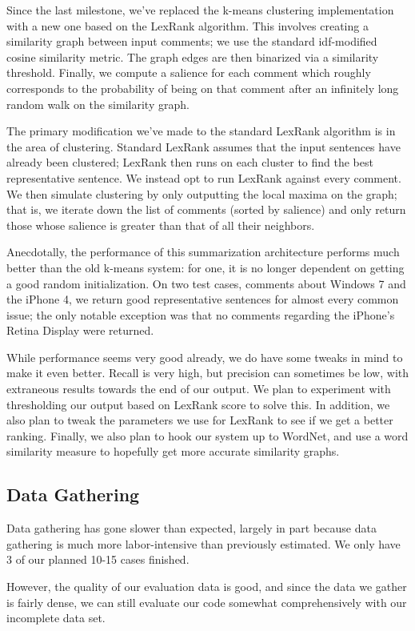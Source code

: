 \documentclass{article}
\begin{document}
Since the last milestone, we've replaced the k-means clustering
implementation with a new one based on the LexRank algorithm.
This involves creating a similarity graph between input comments;
we use the standard idf-modified cosine similarity metric. The
graph edges are then binarized via a similarity threshold. Finally,
we compute a salience for each comment which roughly corresponds
to the probability of being on that comment after an infinitely
long random walk on the similarity graph.

The primary modification we've made to the standard LexRank
algorithm is in the area of clustering. Standard LexRank assumes
that the input sentences have already been clustered; LexRank then
runs on each cluster to find the best representative sentence. We
instead opt to run LexRank against every comment. We then simulate
clustering by only outputting the local maxima on the graph; that
is, we iterate down the list of comments (sorted by salience) and
only return those whose salience is greater than that of all their
neighbors.

Anecdotally, the performance of this summarization architecture
performs much better than the old k-means system: for one, it is no
longer dependent on getting a good random initialization. On two
test cases, comments about Windows 7 and the iPhone 4, we return
good representative sentences for almost every common issue; the
only notable exception was that no comments regarding the iPhone's
Retina Display were returned.

While performance seems very good already, we do have some tweaks
in mind to make it even better. Recall is very high, but precision
can sometimes be low, with extraneous results towards the end
of our output. We plan to experiment with thresholding our output
based on LexRank score to solve this. In addition, we also plan to
tweak the parameters we use for LexRank to see if we get a better
ranking. Finally, we also plan to hook our system up to WordNet,
and use a word similarity measure to hopefully get more accurate
similarity graphs.


\subsection{Data Gathering} %

Data gathering has gone slower than expected, largely in part
because data gathering is much more labor-intensive than previously
estimated. We only have 3 of our planned 10-15 cases finished.

However, the quality of our evaluation data is good, and since
the data we gather is fairly dense, we can still evaluate our code
somewhat comprehensively with our incomplete data set.




\tocsection


\end{document}
